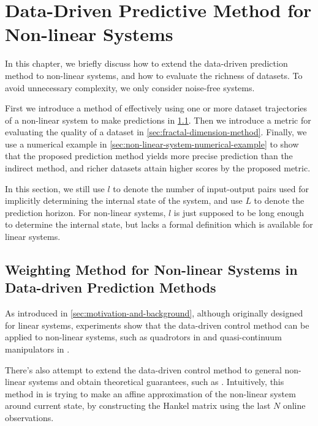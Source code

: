 \chapter{Data-Driven Predictive Method for Non-linear Systems}\label{chap:non-linear-system}

In this chapter, we briefly discuss how to extend the data-driven prediction method to non-linear systems, and how to evaluate the richness of datasets.
To avoid unnecessary complexity, we only consider noise-free systems.

First we introduce a method of effectively using one or more dataset trajectories of a non-linear system to make predictions in \cref{sec:weighting-method}.
Then we introduce a metric for evaluating the quality of a dataset in \cref{sec:fractal-dimension-method}.
Finally, we use a numerical example in \cref{sec:non-linear-system-numerical-example} to show that the proposed prediction method yields more precise prediction than the indirect method, and richer datasets attain higher scores by the proposed metric.

In this section, we still use $l$ to denote the number of input-output pairs used for implicitly determining the internal state of the system, and use $L$ to denote the prediction horizon.
For non-linear systems, $l$ is just supposed to be long enough to determine the internal state, but lacks a formal definition which is available for linear systems.


\section{Weighting Method for Non-linear Systems in Data-driven Prediction Methods}\label{sec:weighting-method}

As introduced in \cref{sec:motivation-and-background}, although originally designed for linear systems, experiments show that the data-driven control method can be applied to non-linear systems, such as quadrotors in \cite{elokdaDataQuad2021} and quasi-continuum manipulators in \cite{mullerDataDrivenQCR2022}.

There's also attempt to extend the data-driven control method to general non-linear systems and obtain theoretical guarantees, such as \cite{berberichLinearTrackingMPCData2022}.
Intuitively, this method in \cite{berberichLinearTrackingMPCData2022} is trying to make an affine approximation of the non-linear system around current state, by constructing the Hankel matrix using the last $N$ online observations.

